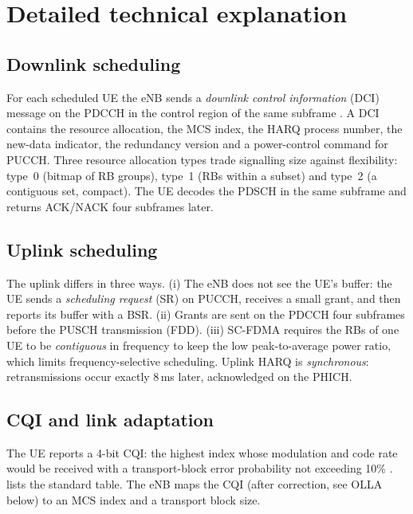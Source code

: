\documentclass[11pt,a4paper]{article}
\begin{document}
\section{Detailed technical explanation}

\subsection{Downlink scheduling}
For each scheduled UE the eNB sends a \emph{downlink control information} (DCI) message on the
PDCCH in the control region of the same subframe \cite{ts36213}. A DCI contains the resource
allocation, the MCS index, the HARQ process number, the new-data indicator, the redundancy version
and a power-control command for PUCCH. Three resource allocation types trade signalling size against
flexibility: type~0 (bitmap of RB groups), type~1 (RBs within a subset) and type~2 (a contiguous set,
compact). The UE decodes the PDSCH in the same subframe and returns ACK/NACK four subframes later.

\subsection{Uplink scheduling}
The uplink differs in three ways. (i) The eNB does not see the UE's buffer: the UE sends a
\emph{scheduling request} (SR) on PUCCH, receives a small grant, and then reports its buffer with a
BSR. (ii) Grants are sent on the PDCCH four subframes before the PUSCH transmission (FDD).
(iii) SC-FDMA requires the RBs of one UE to be \emph{contiguous} in frequency to keep the low
peak-to-average power ratio, which limits frequency-selective scheduling. Uplink HARQ is
\emph{synchronous}: retransmissions occur exactly 8\,ms later, acknowledged on the PHICH.

\subsection{CQI and link adaptation}
The UE reports a 4-bit CQI: the highest index whose modulation and code rate would be received
with a transport-block error probability not exceeding 10\% \cite{ts36213}.  lists the
standard table. The eNB maps the CQI (after correction, see OLLA below) to an MCS index and a
transport block size.
\end{document}
